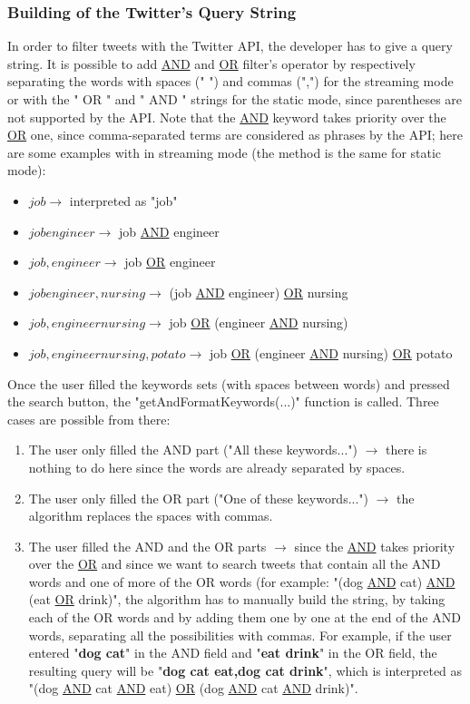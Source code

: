 \documentclass[a4paper,11pt]{report}
\begin{document}
\subsubsection{Building of the Twitter's Query String}
\label{buildingTwitterQueryString}
In order to filter tweets with the Twitter API, the developer has to give a query string. It is possible to add \underline{AND} and \underline{OR} filter's operator by respectively separating the words with spaces (" ") and commas (",") for the streaming mode or with the " OR " and " AND " strings for the static mode, since parentheses are not supported by the API. Note that the \underline{AND} keyword takes priority over the \underline{OR} one, since comma-separated terms are considered as phrases by the API; here are some examples with in streaming mode (the method is the same for static mode):
\begin{itemize}
	\item $job\to$ interpreted as "job"
	\item $job engineer\to$ job \underline{AND} engineer
	\item $job,engineer\to$ job \underline{OR} engineer
	\item $job engineer,nursing\to$ (job \underline{AND} engineer) \underline{OR} nursing
	\item $job,engineer nursing\to$ job \underline{OR} (engineer \underline{AND} nursing)
	\item $job,engineer nursing,potato\to$ job \underline{OR} (engineer \underline{AND} nursing) \underline{OR} potato
\end{itemize}

Once the user filled the keywords sets (with spaces between words) and pressed the search button, the "getAndFormatKeywords(...)" function is called. Three cases are possible from there:
\begin{enumerate}
	\item The user only filled the AND part ("All these keywords...") $\to$ there is nothing to do here since the words are already separated by spaces.
	\item The user only filled the OR part ("One of these keywords...") $\to$ the algorithm replaces the spaces with commas.
	\item The user filled the AND and the OR parts $\to$ since the \underline{AND} takes priority over the \underline{OR} and since we want to search tweets that contain all the AND words and one of more of the OR words (for example: "(dog \underline{AND} cat) \underline{AND} (eat \underline{OR} drink)", the algorithm has to manually build the string, by taking each of the OR words and by adding them one by one at the end of the AND words, separating all the possibilities with commas. For example, if the user entered "\textbf{dog cat}" in the AND field and "\textbf{eat drink}" in the OR field, the resulting query will be "\textbf{dog cat eat,dog cat drink}", which is interpreted as "(dog \underline{AND} cat \underline{AND} eat) \underline{OR} (dog \underline{AND} cat \underline{AND} drink)".
\end{enumerate}
\end{document}
